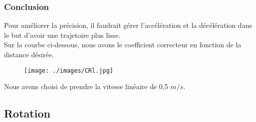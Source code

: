 \documentclass[10pt,a4paper]{article}
\begin{document}
 

\subsubsection{Conclusion}

Pour améliorer la précision, il faudrait gérer l'accélération et la décélération dans le but d'avoir une trajetoire plus lisse.\\
Sur la courbe ci-dessous, nous avons le coefficient correcteur en fonction de la distance désirée.\\

\begin{figure}[!h]
    	\centering
        \texttt{[image: ./images/CRl.jpg]}
\end{figure}

Nous avons choisi de prendre la vitesse linéaire de 0,5 $m/s$.\\


\subsection{Rotation}
\end{document}
